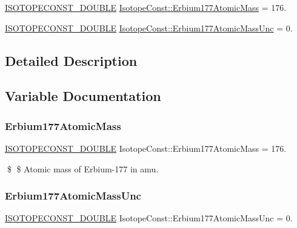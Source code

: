 \begin{DoxyCompactItemize}
\item 
\mbox{\hyperlink{group___isotope_const-_macros_ga8f45a7272ce02c0b4c65c44636ed719a}{I\+S\+O\+T\+O\+P\+E\+C\+O\+N\+S\+T\+\_\+\+D\+O\+U\+B\+LE}} \mbox{\hyperlink{group___isotope_const-_erbium-_er177_gaca93450ce5585b6666f15e8cc308102d}{Isotope\+Const\+::\+Erbium177\+Atomic\+Mass}} = 176.
\item 
\mbox{\hyperlink{group___isotope_const-_macros_ga8f45a7272ce02c0b4c65c44636ed719a}{I\+S\+O\+T\+O\+P\+E\+C\+O\+N\+S\+T\+\_\+\+D\+O\+U\+B\+LE}} \mbox{\hyperlink{group___isotope_const-_erbium-_er177_ga2c5b89b232744d14b4158a6d66bd0d22}{Isotope\+Const\+::\+Erbium177\+Atomic\+Mass\+Unc}} = 0.
\end{DoxyCompactItemize}


\subsection{Detailed Description}


\subsection{Variable Documentation}
\mbox{\label{group___isotope_const-_erbium-_er177_gaca93450ce5585b6666f15e8cc308102d}} 
\subsubsection{\texorpdfstring{Erbium177\+Atomic\+Mass}{Erbium177AtomicMass}}
{\footnotesize\ttfamily \mbox{\hyperlink{group___isotope_const-_macros_ga8f45a7272ce02c0b4c65c44636ed719a}{I\+S\+O\+T\+O\+P\+E\+C\+O\+N\+S\+T\+\_\+\+D\+O\+U\+B\+LE}} Isotope\+Const\+::\+Erbium177\+Atomic\+Mass = 176.}

\$ \$ Atomic mass of Erbium-\/177 in amu. \mbox{\label{group___isotope_const-_erbium-_er177_ga2c5b89b232744d14b4158a6d66bd0d22}} 
\subsubsection{\texorpdfstring{Erbium177\+Atomic\+Mass\+Unc}{Erbium177AtomicMassUnc}}
{\footnotesize\ttfamily \mbox{\hyperlink{group___isotope_const-_macros_ga8f45a7272ce02c0b4c65c44636ed719a}{I\+S\+O\+T\+O\+P\+E\+C\+O\+N\+S\+T\+\_\+\+D\+O\+U\+B\+LE}} Isotope\+Const\+::\+Erbium177\+Atomic\+Mass\+Unc = 0.}

